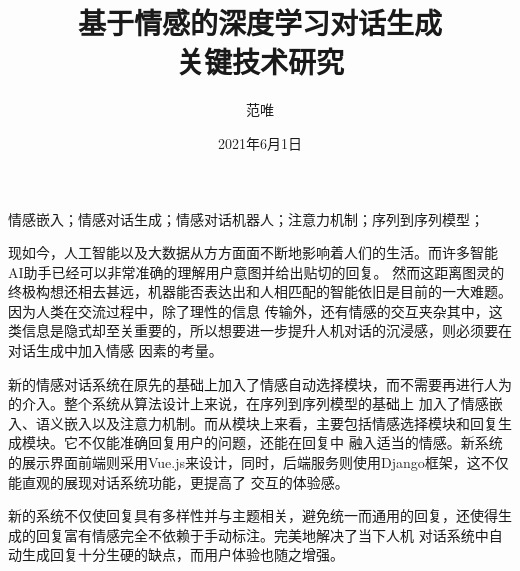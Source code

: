 \documentclass[supercite]{HustGraduPaper}
\title{基于情感的深度学习对话生成\\关键技术研究}
\author{范唯}
\date{2021年6月1日}
\theoremstyle{definition}
\begin{document}
\maketitle

\statement

\clearpage


\begin{cnabstract}{情感嵌入；情感对话生成；情感对话机器人；注意力机制；序列到序列模型；}

现如今，人工智能以及大数据从方方面面不断地影响着人们的生活。而许多智能AI助手已经可以非常准确的理解用户意图并给出贴切的回复。
然而这距离图灵的终极构想还相去甚远，机器能否表达出和人相匹配的智能依旧是目前的一大难题。因为人类在交流过程中，除了理性的信息
传输外，还有情感的交互夹杂其中，这类信息是隐式却至关重要的，所以想要进一步提升人机对话的沉浸感，则必须要在对话生成中加入情感
因素的考量。

新的情感对话系统在原先的基础上加入了情感自动选择模块，而不需要再进行人为的介入。整个系统从算法设计上来说，在序列到序列模型的基础上
加入了情感嵌入、语义嵌入以及注意力机制。而从模块上来看，主要包括情感选择模块和回复生成模块。它不仅能准确回复用户的问题，还能在回复中
融入适当的情感。新系统的展示界面前端则采用Vue.js来设计，同时，后端服务则使用Django框架，这不仅能直观的展现对话系统功能，更提高了
交互的体验感。

新的系统不仅使回复具有多样性并与主题相关，避免统一而通用的回复，还使得生成的回复富有情感完全不依赖于手动标注。完美地解决了当下人机
对话系统中自动生成回复十分生硬的缺点，而用户体验也随之增强。


\end{cnabstract}
\end{document}
